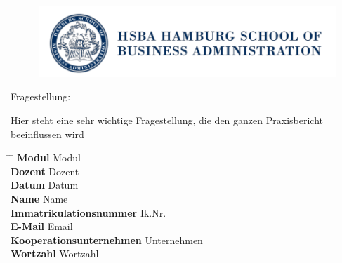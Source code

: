 
\def\Fragestellung{Hier steht eine sehr wichtige Fragestellung, die den ganzen Praxisbericht beeinflussen wird}
\def\Modul{Modul}
\def\Dozent{Dozent}
\def\Datum{Datum}
\def\Name{Name}
\def\Immatrikualtionsnummer{Ik.Nr.}
\def\Emai{Email}
\def\Unternehmen{Unternehmen}
\def\Wortzahl{Wortzahl} %

\begin{figure}[t]
    \centering
    \hspace*{-2.7cm}
    \includegraphics[]{Bilder/HSBA_Logo.png}
\end{figure}

{}

\vspace{2.5cm}
\noindent Fragestellung: \par
\vspace{0.3cm}
\noindent \Fragestellung

\def\IndentationGrund{2.5cm}
\def\IndentationInfo{6cm}


\vspace{2.5cm}
{
\begin{tabbing}
    \hspace*{\IndentationGrund} \= \hspace*{\IndentationInfo} \= \kill
    \> {\small \textbf{Modul}} \> \Modul \\
    \> {\small \textbf{Dozent}} \> \Dozent \\
    \> {\small \textbf{Datum}} \> \Datum \\
    \> {\small \textbf{Name}} \> \Name \\
    \> {\small \textbf{Immatrikulationsnummer}} \> \Immatrikualtionsnummer \\
    \> {\small \textbf{E-Mail}} \> \Emai \\
    \> {\small \textbf{Kooperationsunternehmen}} \> \Unternehmen \\
    \> {\small \textbf{Wortzahl}} \> \Wortzahl
\end{tabbing}
}